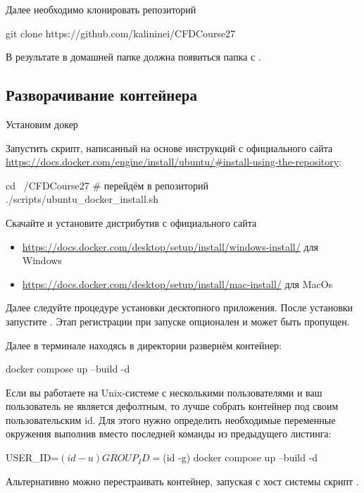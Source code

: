 Далее необходимо клонировать репозиторий

\begin{shelloutput}
git clone https://github.com/kalininei/CFDCourse27
\end{shelloutput}

В результате в домашней папке должна появиться папка с .

\subsection{Разворачивание контейнера}

Установим докер

\begin{tcolorbox}[osstyle, title=Ubuntu+apt]
Запустить скрипт, написанный на основе инструкций с официального сайта \url{https://docs.docker.com/engine/install/ubuntu/#install-using-the-repository}:
\begin{shelloutput}
cd ~/CFDCourse27    # перейдём в репозиторий
./scripts/ubuntu_docker_install.sh
\end{shelloutput}
\end{tcolorbox}

\begin{tcolorbox}[osstyle, title=Windows/MacOs+DockerDesktop]
Скачайте и установите дистрибутив с официального сайта 
\begin{itemize}
\item \url{https://docs.docker.com/desktop/setup/install/windows-install/} для Windows
\item \url{https://docs.docker.com/desktop/setup/install/mac-install/} для MacOs
\end{itemize}
Далее следуйте процедуре установки десктопного приложения.
После установки запустите .
Этап регистрации при запуске опционален и может быть пропущен.
\end{tcolorbox}

Далее в терминале находясь в директории  развернём контейнер:
\begin{shelloutput}
docker compose up --build -d
\end{shelloutput}
Если вы работаете на Unix-системе с несколькими пользователями и ваш пользователь не является дефолтным, то лучше собрать контейнер под своим пользовательским id. Для этого нужно определить необходимые переменные окружения выполнив вместо последней команды из предыдущего листинга:
\begin{shelloutput}
USER_ID=$(id -u) GROUP_ID=$(id -g) docker compose up --build -d
\end{shelloutput}
Альтернативно можно перестраивать контейнер, запуская с хост системы скрипт .

